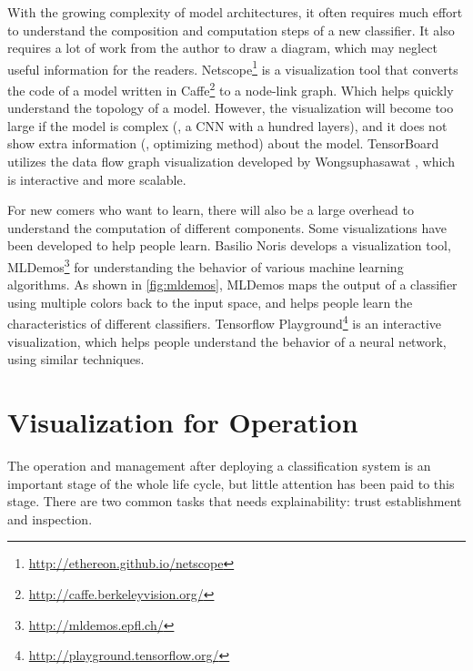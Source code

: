 
With the growing complexity of model architectures, it often requires much effort to understand the composition and computation steps of a new classifier. It also requires a lot of work from the author to draw a diagram, which may neglect useful information for the readers. Netscope\footnote{\url{http://ethereon.github.io/netscope}} is a visualization tool that converts the code of a model written in Caffe\footnote{\url{http://caffe.berkeleyvision.org/}} to a node-link graph. Which helps quickly understand the topology of a model. However, the visualization will become too large if the model is complex (\eg, a CNN with a hundred layers), and it does not show extra information (\eg, optimizing method) about the model. TensorBoard utilizes the data flow graph visualization developed by Wongsuphasawat \cite{wongsuphasawat2017dataflow}, which is interactive and more scalable.

For new comers who want to learn, there will also be a large overhead to understand the computation of different components. Some visualizations have been developed to help people learn. Basilio Noris develops a visualization tool, MLDemos\footnote{\url{http://mldemos.epfl.ch/}} for understanding the behavior of various machine learning algorithms. As shown in \autoref{fig:mldemos}, MLDemos maps the output of a classifier using multiple colors back to the input space, and helps people learn the characteristics of different classifiers. Tensorflow Playground\footnote{\url{http://playground.tensorflow.org/}} is an interactive visualization, which helps people understand the behavior of a neural network, using similar techniques.


\section{Visualization for Operation}
The operation and management after deploying a classification system is an important stage of the whole life cycle, but  little attention has been paid to this stage. There are two common tasks that needs explainability: trust establishment and inspection.

